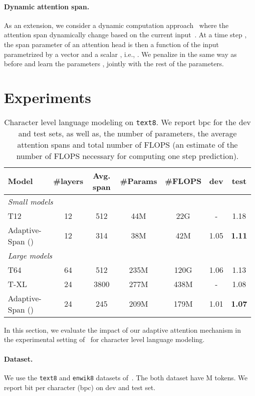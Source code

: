 \documentclass[11pt,a4paper]{article}
\begin{document}
\paragraph{Dynamic attention span.}
As an extension, we consider a dynamic computation approach~\citep{graves2016adaptive} where the attention span dynamically change based on the current input~\citep{Luong2015EffectiveAT,Shu2017AnES}.
At a time step , the span parameter  of an attention head is then a function of the input parametrized by a vector  and a scalar , i.e., .
We penalize  in the same way as before and learn the parameters ,  jointly with the rest of the parameters.
 
\section{Experiments}

\begin{table*}[t]
\centering
\begin{tabular}{lcccccc}
  \toprule
  Model & \#layers & Avg. span & \#Params & \#FLOPS & dev & test \\
  \midrule
  \multicolumn{6}{l}{\emph{Small models}}\\
  T12~\citep{al2018character} & 12 & 512 & 44M & 22G & - & 1.18\\
  Adaptive-Span () & 12  & 314 & 38M & 42M & 1.05 & \bf 1.11 \\
  \midrule
  \multicolumn{6}{l}{\emph{Large models}}\\
  T64~\citep{al2018character} & 64 & 512 & 235M & 120G & 1.06 & 1.13\\
  T-XL~\citep{dai2018transformer} & 24 & 3800 & 277M & 438M & - & 1.08\\
  Adaptive-Span () & 24 & 245 & 209M & 179M & 1.01 & \bf 1.07 \\
  \bottomrule
\end{tabular}
  \caption{
    Character level language modeling on \texttt{text8}.
    We report bpc for the dev and test sets, as well as, the number of parameters, the average attention spans and total number of FLOPS (an estimate of the number of FLOPS necessary for computing one step prediction).
  }
\label{tab:result}
\end{table*}

In this section, we evaluate the impact of our adaptive attention mechanism in the experimental setting of~\citet{al2018character} for character level language modeling.

\paragraph{Dataset.}
We use the \texttt{text8} and \texttt{enwik8} datasets of~\citet{mahoney2011large}. The both dataset have M tokens.
We report bit per character (bpc) on dev and test set.
\end{document}
